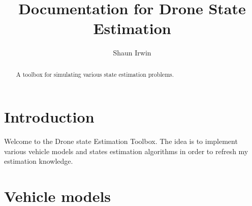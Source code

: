 \documentclass{article}
\begin{document}
\title{Documentation for Drone State Estimation}
\author{Shaun Irwin}

\maketitle

\begin{abstract}
A toolbox for simulating various state estimation problems.
\end{abstract}

\section{Introduction}
Welcome to the Drone state Estimation Toolbox. The idea is to implement various vehicle models and states estimation algorithms in order to refresh my estimation knowledge.

\section{Vehicle models}
\end{document}
